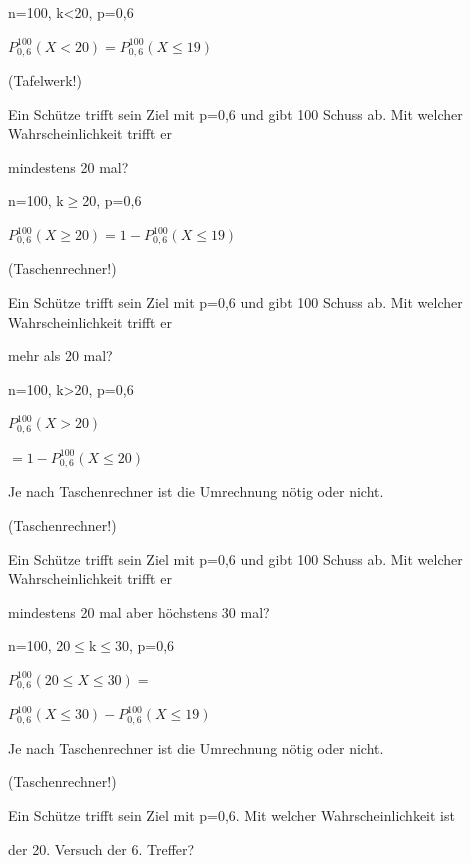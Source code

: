 \begin{antwort}n=100, k<20, p=0,6
	
	\bigskip
	$P^{100}_{0,6}(X<20)=P^{100}_{0,6}(X\leq19)$
	
	(Tafelwerk!)\end{antwort}
\begin{frage}\large
	Ein Schütze trifft sein Ziel mit p=0,6 und gibt 100 Schuss ab. Mit welcher Wahrscheinlichkeit trifft er 
	
	\LARGE 
	mindestens 20 mal?\end{frage}
\begin{antwort}n=100, k$\geq$20, p=0,6
	
	\bigskip
	$P^{100}_{0,6}(X\geq 20)=1-P^{100}_{0,6}(X\leq 19)$
	
	 (Taschenrechner!)\end{antwort}
\begin{frage}\large
	Ein Schütze trifft sein Ziel mit p=0,6 und gibt 100 Schuss ab. Mit welcher Wahrscheinlichkeit trifft er 
	
	\LARGE 
	mehr als 20 mal?\end{frage}
\begin{antwort}n=100, k>20, p=0,6
	
	\bigskip
	$P^{100}_{0,6}(X>20)$ 
	
	$=1-P^{100}_{0,6}(X\leq 20)$
	
	Je nach Taschenrechner ist die Umrechnung nötig oder nicht.
	
	(Taschenrechner!)\end{antwort}
\begin{frage}\large
	Ein Schütze trifft sein Ziel mit p=0,6 und gibt 100 Schuss ab. Mit welcher Wahrscheinlichkeit trifft er 
	
	\LARGE 
	mindestens 20 mal aber höchstens 30 mal?\end{frage}
\begin{antwort}n=100, 20$\leq$k$\leq$30, p=0,6
	
	\bigskip\large
	$P^{100}_{0,6}(20\leq X \leq30) =$
	
	$P^{100}_{0,6}(X\leq30)-P^{100}_{0,6}(X\leq19)$
	
	Je nach Taschenrechner ist die Umrechnung nötig oder nicht.

	(Taschenrechner!)\end{antwort}
\begin{frage}\large
	Ein Schütze trifft sein Ziel mit p=0,6. Mit welcher Wahrscheinlichkeit ist 
	
	\LARGE 
	der 20. Versuch der 6. Treffer?\end{frage}
